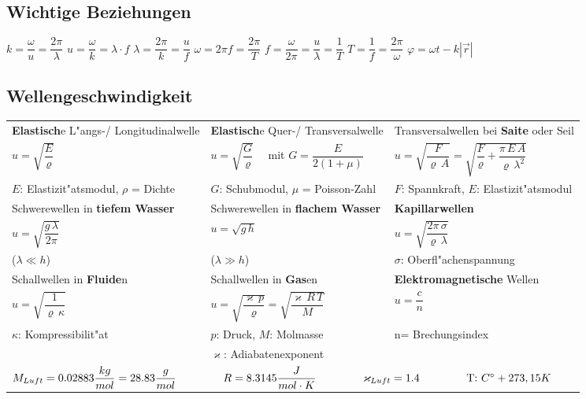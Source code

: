 \subsection{Wichtige Beziehungen}
$\boxed{k=\dfrac{\omega}{u}=\dfrac{2\pi}{\lambda}}$\quad
$\boxed{u=\dfrac{\omega}{k} = \lambda \cdot f}$ \quad
$\boxed{\lambda=\dfrac{2\pi}{k}=\dfrac{u}{f}}$ \quad
$\boxed{\omega=2\pi f=\dfrac{2\pi}{T}}$ \quad
$\boxed{f=\dfrac{\omega}{2\pi}=\dfrac{u}{\lambda}=\dfrac{1}{T}}$ \quad
$\boxed{T=\dfrac{1}{f}=\dfrac{2\pi}{\omega}}$ \quad
$\boxed{\varphi=\omega t-k|\vec{r}|}$

\subsection{Wellengeschwindigkeit  }
\renewcommand{\arraystretch}{1.5}
\begin{tabular}{| p{6cm} | p{6cm} | p{6cm} |}
\hline
\textbf{Elastisch}e L"angs-/ Longitudinalwelle & \textbf{Elastisch}e Quer-/ Transversalwelle & Transversalwellen bei \textbf{Saite} oder Seil\\
$u=\sqrt{\dfrac{E}{\varrho}}$ & $u=\sqrt{\dfrac{G}{\varrho} }\quad$ mit $G=\dfrac{E}{2(1+\mu)}$ &
$u=\sqrt{\dfrac{F}{\varrho\,A}}=\sqrt{\dfrac{F}{\varrho}+\dfrac{\pi\,E\,A}{\varrho\,\lambda^2}}$
\\ $E$: Elastizit"atsmodul, $\rho$ = Dichte& $G$: Schubmodul, $\mu$ = Poisson-Zahl & $F$: Spannkraft, $E$:
Elastizit"atsmodul \\
\hline

Schwerewellen in \textbf{tiefem Wasser} & Schwerewellen in \textbf{flachem Wasser}& \textbf{Kapillarwellen}\\
$u=\sqrt{\dfrac{g\,\lambda}{2\pi}}$&$u=\sqrt{g\,h}$&$u=\sqrt{\dfrac{2\pi\,\sigma}{\varrho\,\lambda}}$\\
($\lambda \ll h$) & ($\lambda \gg h$)  & $\sigma$: Oberfl"achenspannung \\
\hline

Schallwellen in \textbf{Fluide}n & Schallwellen in \textbf{Gas}en & \textbf{Elektromagnetische} Wellen\\
$u=\sqrt{\dfrac{1}{\varrho\,\kappa}}$&$u=\sqrt{\dfrac{\varkappa\,p}{\varrho}}=\sqrt{\dfrac{\varkappa\,R\,T}{M}}$&
$u = \dfrac{c}{n}$\\
$\kappa$: Kompressibilit"at &$p$: Druck, $M$: Molmasse& n= Brechungsindex\\
& $\varkappa$: Adiabatenexponent&\\
\hline
\multicolumn{3}{|l|}{
	$M_{Luft}=
	0.02883 \dfrac{kg}{mol} = 28.83 \dfrac{g}{mol} \hspace{1.5cm}
	R=8.3145 \dfrac{J}{mol\cdot K} \hspace{1.5cm}
	\varkappa_{Luft}=1.4 \hspace{1.5cm}
	\text{T: }C^\circ+273,15K$
}\\
\hline
\end{tabular}
\renewcommand{\arraystretch}{1}

